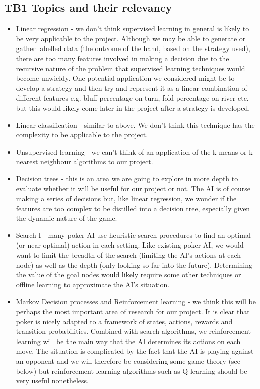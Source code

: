 \documentclass{article}
\begin{document}
\begin{multicols*}{2}
\section{TB1 Topics and their relevancy}
\begin{itemize}
    \item Linear regression - we don't think supervised learning in general is likely to be very applicable to the project. Although we may be able to generate or gather labelled data (the outcome of the hand, based on the strategy used), there are too many features involved in making a decision due to the recursive nature of the problem that supervised learning techniques would become unwieldy. One potential application we considered might be to develop a strategy and then try and represent it as a linear combination of different features e.g. bluff percentage on turn, fold percentage on river etc. but this would likely come later in the project after a strategy is developed.
    \item Linear classification - similar to above. We don't think this technique has the complexity to be applicable to the project.
    \item Unsupervised learning - we can't think of an application of the k-means or k nearest neighbour algorithms to our project.
    \item Decision trees - this is an area we are going to explore in more depth to evaluate whether it will be useful for our project or not. The AI is of course making a series of decisions but, like linear regression, we wonder if the features are too complex to be distilled into a decision tree, especially given the dynamic nature of the game.
    \item Search I - many poker AI use heuristic search procedures to find an optimal (or near optimal) action in each setting. Like existing poker AI, we would want to limit the breadth of the search (limiting the AI's actions at each node) as well as the depth (only looking so far into the future). Determining the value of the goal nodes would likely require some other techniques or offline learning to approximate the AI's situation.
    \item Markov Decision processes and Reinforcement learning - we think this will be perhaps the most important area of research for our project. It is clear that poker is nicely adapted to a framework of states, actions, rewards and transition probabilities. Combined with search algorithms, we reinforcement learning will be the main way that the AI determines its actions on each move. The situation is complicated by the fact that the AI is playing against an opponent and we will therefore be considering some game theory (see below) but reinforcement learning algorithms such as Q-learning should be very useful nonetheless.

\end{itemize}
\end{multicols*}
\end{document}
